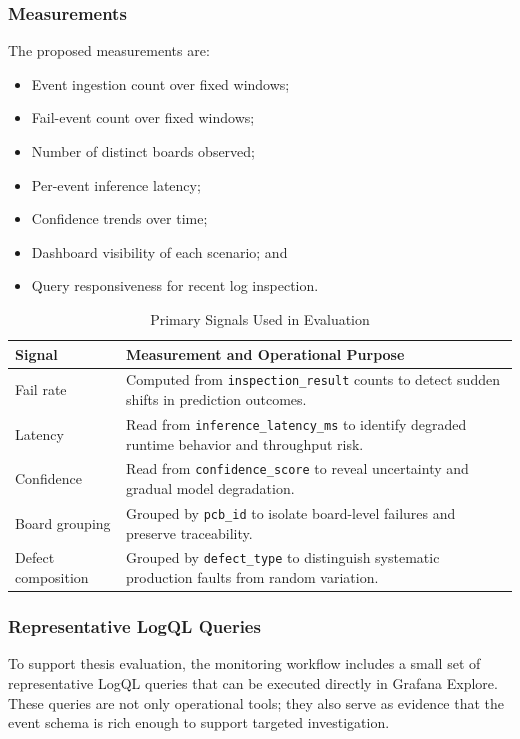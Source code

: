 \documentclass[12pt,a4paper]{article}
\begin{document}
\subsubsection{Measurements}
The proposed measurements are:
\begin{itemize}
    \item Event ingestion count over fixed windows;
    \item Fail-event count over fixed windows;
    \item Number of distinct boards observed;
    \item Per-event inference latency;
    \item Confidence trends over time;
    \item Dashboard visibility of each scenario; and
    \item Query responsiveness for recent log inspection.
\end{itemize}

\begin{table}[!ht]
\centering
\caption{Primary Signals Used in Evaluation}
\label{tab:experiments}
\begin{tabular}{p{} p{}}
\toprule
\textbf{Signal} & \textbf{Measurement and Operational Purpose} \\
\midrule
Fail rate & Computed from \texttt{inspection\_result} counts to detect sudden shifts in prediction outcomes. \\
Latency & Read from \texttt{inference\_latency\_ms} to identify degraded runtime behavior and throughput risk. \\
Confidence & Read from \texttt{confidence\_score} to reveal uncertainty and gradual model degradation. \\
Board grouping & Grouped by \texttt{pcb\_id} to isolate board-level failures and preserve traceability. \\
Defect composition & Grouped by \texttt{defect\_type} to distinguish systematic production faults from random variation. \\
\bottomrule
\end{tabular}
\end{table}

\subsubsection{Representative LogQL Queries}
To support thesis evaluation, the monitoring workflow includes a small set
of representative LogQL queries that can be executed directly in Grafana
Explore. These queries are not only operational tools; they also serve as
evidence that the event schema is rich enough to support targeted
investigation.
\end{document}
